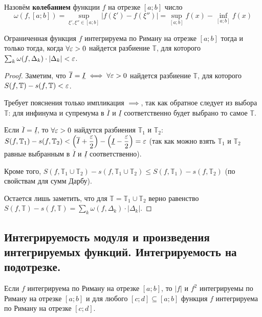\documentclass[a4paper]{article}
\theoremstyle{named}
\newcommand{\T}{\mathbb{T}}
\begin{document}
        \begin{definition*}
            Назовём \textbf{колебанием} функции $f$ на отрезке $[a; b]$ число
            \begin{equation*}
                \omega(f, [a; b]) = \sup\limits_{\xi', \xi'' \in [a; b]} |f(\xi') - f(\xi'')| = \sup\limits_{[a; b]} f(x) - \inf\limits_{[a; b]} f(x)
            \end{equation*}
        \end{definition*}

        \begin{consequence*}
            Ограниченная функция $f$ интегрируема по Риману на отрезке $[a; b]$ тогда и только тогда, когда $\forall \varepsilon > 0$ найдется разбиение $\T$, для которого $\sum_k \omega(f, \Delta_k) \cdot |\Delta_k| < \varepsilon$.
        \end{consequence*}

        \begin{proof}
            Заметим, что $\overline{I} = \underline{I} \iff \forall \varepsilon > 0$ найдется разбиение $\T$, для которого $S(f, \T) - s(f, \T) < \eps$.

            Требует пояснения только импликация $\implies$, так как обратное следует из выбора $\T$: для инфинума и супремума в $\overline{I}$ и $\underline{I}$ соответственно будет выбрано то самое $\T$.

            Если $\overline{I} = \underline{I}$, то $\forall \varepsilon > 0$ найдутся разбиения $\T_1$ и $\T_2$: $S(f, \T_1) - s(f, \T_2) < \left(\overline{I} + \dfrac{\eps}{2}\right) - \left(\underline{I} - \dfrac{\eps}{2}\right) = \eps$ (так как можно взять $\T_1$ и $\T_2$ равные выбранным в $\overline{I}$ и $\underline{I}$ соответственно).

            Кроме того, $S(f, \T_1 \cup \T_2) - s(f, \T_1 \cup \T_2) \leq S(f, \T_1) - s(f, \T_2)$ (по свойствам для сумм Дарбу). 

            Остается лишь заметить, что для $\T = \T_1 \cup \T_2$ верно равенство $S(f, \T) - s(f, \T) = \sum_k \omega(f, \Delta_k) \cdot |\Delta_k|$.
        \end{proof}

        \subsection{Интегрируемость модуля и произведения интегрируемых функций. Интегрируемость на подотрезке.}

        \begin{consequence*}
            Если $f$ интегрируема по Риману на отрезке $[a; b]$, то $|f|$ и $f^2$ интегрируемы по Риману на отрезке $[a; b]$ и для любого $[c; d] \subseteq [a; b]$ функция $f$ интегрируема по Риману на отрезке $[c; d]$.
        \end{consequence*}
\end{document}
